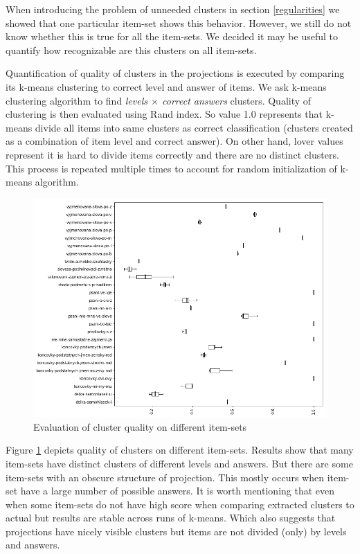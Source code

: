 \documentclass[
  digital, %
  table,   %
  nolof,     %
  nolot,     %
  nocover,
  color,
  final, %
]{fithesis3}
\begin{document}
When introducing the problem of unneeded clusters in section \ref{regularities} we showed that one particular item-set shows this behavior. However, we still do not know whether this is true for all the item-sets. We decided it may be useful to quantify how recognizable are this clusters on all item-sets.


Quantification of quality of clusters in the projections is executed by comparing its k-means clustering to correct level and answer of items. We ask k-means clustering algorithm to find \textit{levels $\times$ correct answers} clusters. Quality of clustering is then evaluated using Rand index. So value 1.0 represents that k-means divide all items into same clusters as correct classification (clusters created as a combination of item level and correct answer). On other hand, lover values represent it is hard to divide items correctly and there are no distinct clusters. This process is repeated multiple times to account for random initialization of k-means algorithm.

\begin{figure}
  \includegraphics[width=\textwidth]{img/clustering_quality}
  \caption{Evaluation of cluster quality on different item-sets}
  \label{fig:clustering_quality}
\end{figure}

Figure \ref{fig:clustering_quality} depicts quality of clusters on different item-sets. Results show that many item-sets have distinct clusters of different levels and answers. But there are some item-sets with an obscure structure of projection. This mostly occurs when item-set have a large number of possible answers. It is worth mentioning that even when some item-sets do not have high score when comparing extracted clusters to actual but results are stable across runs of k-means. Which also suggests that projections have nicely visible clusters but items are not divided (only) by levels and answers.
\end{document}
